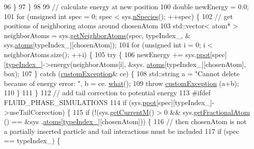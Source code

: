 \begin{DoxyCode}
96             \}
97         \}
98 
99     \textcolor{comment}{// calculate energy at new position}
100         \textcolor{keywordtype}{double} newEnergy = 0.0;
101         \textcolor{keywordflow}{for} (\textcolor{keywordtype}{unsigned} \textcolor{keywordtype}{int} spec = 0; spec < sys.\hyperlink{classsim_system_ab5e2e9b6204de15520302fe1d51688dd}{nSpecies}(); ++spec) \{
102             \textcolor{comment}{// get positions of neighboring atoms around chosenAtom}
103             std::vector< atom* > neighborAtoms = sys.\hyperlink{classsim_system_a9b3aeefa22c3b50b5913df6eea753bc6}{getNeighborAtoms}(spec, typeIndex\_, &
      sys.\hyperlink{classsim_system_a90421b19082f7fb8fc23b7264b1161e4}{atoms}[typeIndex\_][chosenAtom]);
104             \textcolor{keywordflow}{for} (\textcolor{keywordtype}{unsigned} \textcolor{keywordtype}{int} i = 0; i < neighborAtoms.size(); ++i) \{
105             \textcolor{keywordflow}{try} \{
106                 newEnergy += sys.\hyperlink{classsim_system_ad2e290b5963f132e6a3a56cee35c8e9f}{ppot}[spec][\hyperlink{classmc_move_acb731965547b0326ef318ec96da8b46a}{typeIndex\_}]->energy(neighborAtoms[i], &sys.
      \hyperlink{classsim_system_a90421b19082f7fb8fc23b7264b1161e4}{atoms}[typeIndex\_][chosenAtom], box);
107             \} \textcolor{keywordflow}{catch} (\hyperlink{classcustom_exception}{customException}& ce) \{
108                 std::string a = \textcolor{stringliteral}{"Cannot delete because of energy error: "}, b = ce.
      \hyperlink{classcustom_exception_aeb6ab5848b038adfc68fde86a512f691}{what}();
109                 \textcolor{keywordflow}{throw} \hyperlink{classcustom_exception}{customException} (a+b);
110             \}
111             \}
112             \textcolor{comment}{// add tail correction to potential energy}
113 \textcolor{preprocessor}{#ifdef FLUID\_PHASE\_SIMULATIONS}
114 \textcolor{preprocessor}{}            \textcolor{keywordflow}{if} (sys.\hyperlink{classsim_system_ad2e290b5963f132e6a3a56cee35c8e9f}{ppot}[spec][typeIndex\_]->useTailCorrection) \{
115                 \textcolor{keywordflow}{if} (!(sys.\hyperlink{classsim_system_a299fe4372e610b554eaaf5f5957b2dbc}{getCurrentM}() > 0 && sys.\hyperlink{classsim_system_a2ab77377c60e0e3109a6e875690b0ab7}{getFractionalAtom} () == &sys
      .\hyperlink{classsim_system_a90421b19082f7fb8fc23b7264b1161e4}{atoms}[\hyperlink{classmc_move_acb731965547b0326ef318ec96da8b46a}{typeIndex\_}][chosenAtom])) \{
116                     \textcolor{comment}{// then chosenAtom is not a partially inserted particle and tail interactions must be
       included}
117                     \textcolor{keywordflow}{if} (spec == typeIndex\_) \{

\end{DoxyCode}
